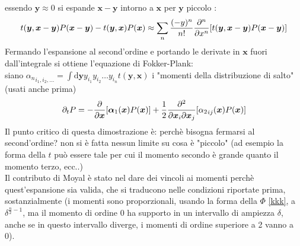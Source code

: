 \documentclass[a4paper,12pt]{article}
\theoremstyle{plain}
\renewcommand{\vec}[1]{{\boldsymbol{#1}}}
\theoremstyle{definition}
\newcommand{\f}[2]{\frac{#1}{#2}}
\newcommand{\tdv}{\partial_t}
\renewcommand{\d}{\text{d}}
\newcommand{\pos}{\vec{x}}
\theoremstyle{remark}
\begin{document}
essendo $\vec{y}\approx 0$ si espande $\pos-\vec{y}$ intorno a $\pos$  per $\vec{y}$ piccolo :
\[t(\vec{y},\pos-\vec{y})P(\pos-\vec{y})-t(\vec{y},\pos)P(\pos)\approx	\sum_n\f{(-y)^n}{n!}\pdv[n]{x}[t(\vec{y},\pos-\vec{y})P(\pos-\vec{y})]	\]
Fermando l'espansione al second'ordine e portando le derivate in $\pos$ fuori dall'integrale si ottiene l'equazione di Fokker-Plank: 
\\siano ${\alpha_n}_{i_1,i_2,\ldots}=\int \d \vec{y} y_{i_1}y_{i_2}\ldots y_{i_n} t(\vec{y},\pos)$ i "momenti della distribuzione di salto" (usati anche prima)
\[\tdv P=-\pdv{\pos} [\vec{\alpha}_1(\pos) P(\pos)]+\f{1}{2}\pdv{}{\pos_i}{\pos_j}[{\alpha_2}_{ij}(\pos)P(\pos)]	\]
Il punto critico di questa dimostrazione è: perchè bisogna fermarsi al second'ordine? non si è fatta nessun limite su cosa è "piccolo" (ad esempio la forma della $t$ può essere tale per cui il momento secondo è grande quanto il momento terzo, ecc..)\\Il contributo di Moyal è stato nel dare dei vincoli ai momenti perchè quest'espansione sia valida, che si traducono nelle condizioni riportate prima, sostanzialmente (i momenti sono proporzionali, usando la forma della $\Phi$ \ref{kkk}, a $\delta^{\f{n}{2}-1}$, ma il momento di ordine $0$ ha supporto in un intervallo di ampiezza $\delta$, anche se in questo intervallo diverge, i momenti di ordine superiore a 2 vanno a 0).
\end{document}

